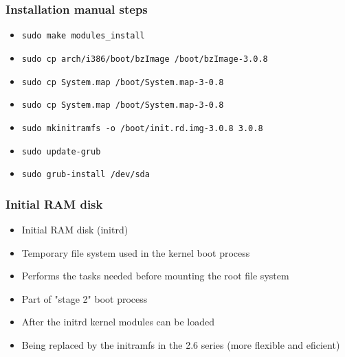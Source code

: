 \documentclass{beamer}
\begin{document}

\begin{frame}
\frametitle{Installation manual steps}

{\small

 \begin{itemize}
     \item \texttt{sudo make modules\_install}
     \item \texttt{sudo cp arch/i386/boot/bzImage /boot/bzImage-3.0.8}
     \item \texttt{sudo cp System.map /boot/System.map-3-0.8}
     \item \texttt{sudo cp System.map /boot/System.map-3-0.8}
     \item \texttt{sudo mkinitramfs -o /boot/init.rd.img-3.0.8 3.0.8}
     \item \texttt{sudo update-grub}
     \item \texttt{sudo grub-install /dev/sda}
 \end{itemize}

}

\end{frame}


\begin{frame}
\frametitle{Initial RAM disk}

 \begin{itemize}
 	\item Initial RAM disk (initrd)
 	\item Temporary file system used in the kernel boot process
 	\item Performs the tasks needed before mounting the root file system
 	\item Part of "stage 2" boot process
 	\item After the initrd kernel modules can be loaded
 	\item Being replaced by the initramfs in the 2.6 series (more flexible and eficient)
 \end{itemize}

\end{frame}


\end{document}
